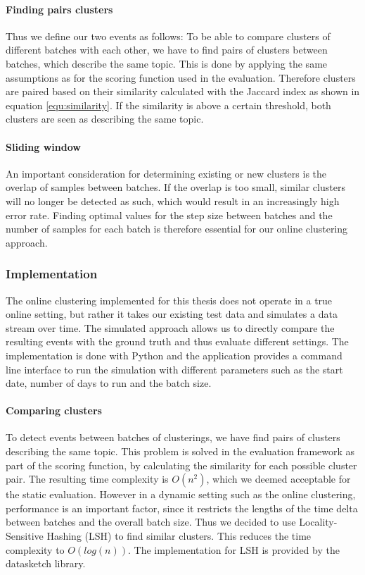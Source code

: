 \paragraph{Finding pairs clusters}
Thus we define our two events as follows:
To be able to compare clusters of different batches with each other, we have to find pairs of clusters between batches, which describe the same topic. This is done by applying the same assumptions as for the scoring function used in the evaluation. Therefore clusters are paired based on their similarity calculated with the Jaccard index as shown in equation \ref{equ:similarity}. If the similarity is above a certain threshold, both clusters are seen as describing the same topic.

\paragraph{Sliding window}

An important consideration for determining existing or new clusters is the overlap of samples between batches. If the overlap is too small, similar clusters will no longer be detected as such, which would result in an increasingly high error rate. Finding optimal values for the step size between batches and the number of samples for each batch is therefore essential for our online clustering approach.

\subsubsection{Implementation}

The online clustering implemented for this thesis does not operate in a true online setting, but rather it takes our existing test data and simulates a data stream over time. The simulated approach allows us to directly compare the resulting events with the ground truth and thus evaluate different settings. The implementation is done with Python and the application provides a command line interface to run the simulation with different parameters such as the start date, number of days to run and the batch size.

\paragraph{Comparing clusters}
To detect events between batches of clusterings,
we have find pairs of clusters describing the same topic.
This problem is solved in the evaluation framework as part of the scoring function,
by calculating the similarity for each possible cluster pair.
The resulting time complexity is $O(n^2)$, which we deemed acceptable for the static evaluation.
However in a dynamic setting such as the online clustering, performance is an important factor,
since it restricts the lengths of the time delta between batches and the overall batch size.
Thus we decided to use Locality-Sensitive Hashing (LSH)\cite{alex2015practical} to find similar clusters.
This reduces the time complexity to $O(log(n))$.
The implementation for LSH is provided by the datasketch library\cite{eric_zhu_2017_290602}.

